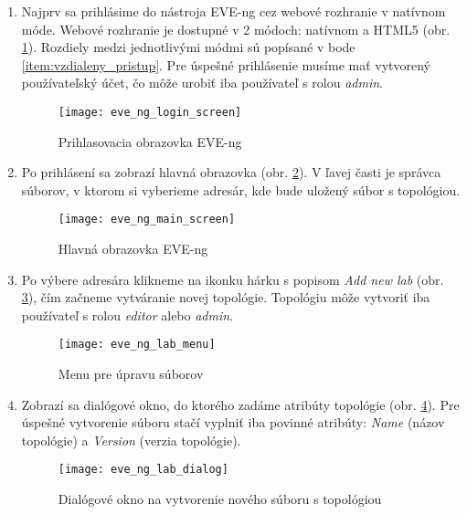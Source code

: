 \begin{enumerate}[noitemsep]

    \item \label{item:prihlasenie} Najprv sa prihlásime do nástroja EVE-ng cez webové rozhranie v natívnom móde. Webové rozhranie je dostupné v 2 módoch: natívnom a HTML5 (obr. \ref{obr:eve_ng_login_screen}). Rozdiely medzi jednotlivými módmi sú popísané v bode \ref{item:vzdialeny_pristup}. Pre úspešné prihlásenie musíme mať vytvorený používateľský účet, čo môže urobiť iba používateľ s rolou \emph{admin}.

\begin{figure}
    \centering
    \texttt{[image: eve\_ng\_login\_screen]}
    \caption{Prihlasovacia obrazovka EVE-ng}
    \label{obr:eve_ng_login_screen}
\end{figure}

    \item Po prihlásení sa zobrazí hlavná obrazovka (obr. \ref{obr:eve_ng_main_screen}). V ľavej časti je správca súborov, v ktorom si vyberieme adresár, kde bude uložený súbor s topológiou.

\begin{figure}
    \centering
    \texttt{[image: eve\_ng\_main\_screen]}
    \caption{Hlavná obrazovka EVE-ng}
    \label{obr:eve_ng_main_screen}
\end{figure}

    \item Po výbere adresára klikneme na ikonku hárku s popisom \emph{Add new lab} (obr. \ref{obr:eve_ng_lab_menu}), čím začneme vytváranie novej topológie. Topológiu môže vytvoriť iba používateľ s rolou \emph{editor} alebo \emph{admin}.

\begin{figure}
    \centering
        \texttt{[image: eve\_ng\_lab\_menu]}
    \caption{Menu pre úpravu súborov}
    \label{obr:eve_ng_lab_menu}
\end{figure}

    \item Zobrazí sa dialógové okno, do ktorého zadáme atribúty topológie (obr. \ref{obr:eve_ng_lab_dialog}). Pre úspešné vytvorenie súboru stačí vyplniť iba povinné atribúty: \emph{Name} (názov topológie) a \emph{Version} (verzia topológie).

\begin{figure}
    \centering
    \texttt{[image: eve\_ng\_lab\_dialog]}
    \caption{Dialógové okno na vytvorenie nového súboru s topológiou}
    \label{obr:eve_ng_lab_dialog}
\end{figure}


\end{enumerate}
